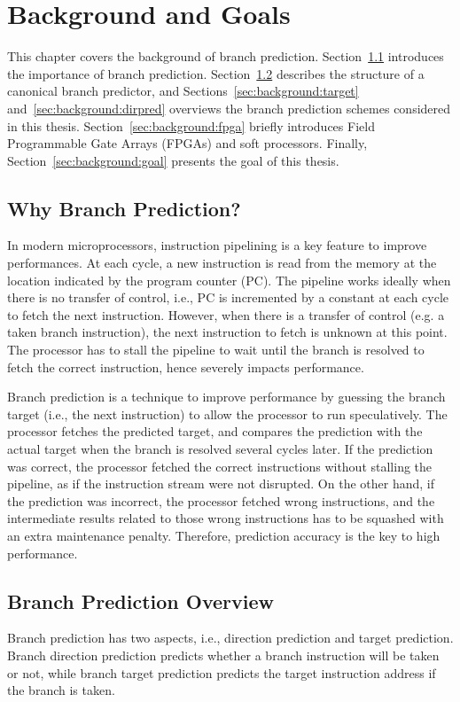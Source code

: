 \chapter{Background and Goals}
\label{chap:background}
This chapter covers the background of branch prediction. Section~\ref{sec:background:whybp} introduces the importance of branch prediction. Section~\ref{sec:background:bpoverview} describes the structure of a canonical branch predictor, and Sections~\ref{sec:background:target} and~\ref{sec:background:dirpred} overviews the branch prediction schemes considered in this thesis. Section~\ref{sec:background:fpga} briefly introduces Field Programmable Gate Arrays (FPGAs) and soft processors. Finally, Section~\ref{sec:background:goal} presents the goal of this thesis. 

\section{Why Branch Prediction?}
\label{sec:background:whybp}
In modern microprocessors, instruction pipelining is a key feature to improve performances. At each cycle, a new instruction is read from the memory at the location indicated by the program counter (PC). The pipeline works ideally when there is no transfer of control, i.e., PC is incremented by a constant at each cycle to fetch the next instruction. However, when there is a transfer of control (e.g. a taken branch instruction), the next instruction to fetch is unknown at this point. The processor has to stall the pipeline to wait until the branch is resolved to fetch the correct instruction, hence severely impacts performance.

Branch prediction is a technique to improve performance by guessing the branch target (i.e., the next instruction) to allow the processor to run speculatively. The processor fetches the predicted target, and compares the prediction with the actual target when the branch is resolved several cycles later. If the prediction was correct, the processor fetched the correct instructions without stalling the pipeline, as if the instruction stream were not disrupted. On the other hand, if the prediction was incorrect, the processor fetched wrong instructions, and the intermediate results related to those wrong instructions has to be squashed with an extra maintenance penalty. Therefore, prediction accuracy is the key to high performance.

\section{Branch Prediction Overview}
\label{sec:background:bpoverview}
Branch prediction has two aspects, i.e., direction prediction and target prediction. Branch direction prediction predicts whether a branch instruction will be taken or not, while branch target prediction predicts the target instruction address if the branch is taken.


